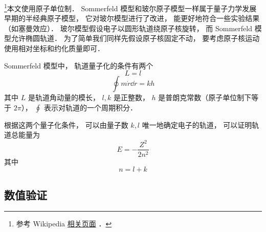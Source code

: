 

\footnote{参考 Wikipedia \href{https://en.wikipedia.org/wiki/Old_quantum_theory}{相关页面}
．}本文使用原子单位制． Sommerfeld 模型和玻尔原子模型一样属于量子力学发展早期的半经典原子模型， 它对玻尔模型进行了改进， 能更好地符合一些实验结果（如塞曼效应）． 玻尔模型假设电子以圆形轨道绕原子核旋转， 而 Sommerfeld 模型允许椭圆轨道． 为了简单我们同样先假设原子核固定不动， 要考虑原子核运动使用相对坐标和约化质量即可．

Sommerfeld 模型中， 轨道量子化的条件有两个
\begin{equation}\label{BohrEc_eq4}
L = l
\end{equation}
\begin{equation}\label{BohrEc_eq3}
\oint m\dot r \dd{r} = kh
\end{equation}
其中 $L$ 是轨道角动量的模长， $l, k$ 是正整数， $h$ 是普朗克常数（原子单位制下等于 $2\pi$）， $\oint$ 表示对轨道的一个周期积分． 

根据这两个量子化条件， 可以由量子数 $k, l$ 唯一地确定电子的轨道， 可以证明轨道总能量为
\begin{equation}\label{BohrEc_eq5}
E = -\frac{Z^2}{2n^2}
\end{equation}
其中
\begin{equation}\label{BohrEc_eq2}
n = l + k
\end{equation}

\subsection{数值验证}


